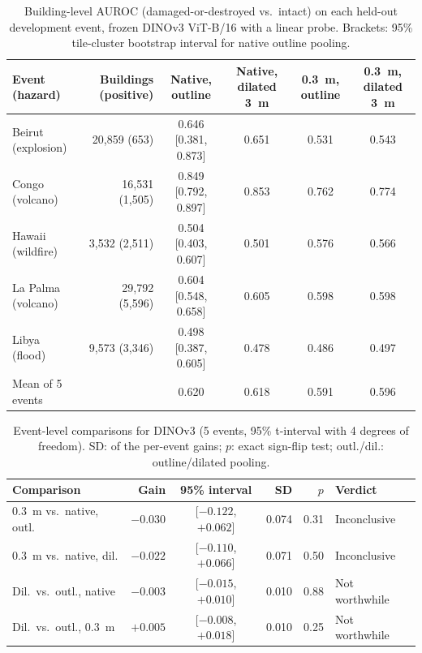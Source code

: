 \documentclass{ieeeaccess}
\begin{document}
\begin{table}[t]
\centering
\caption{Building-level AUROC (damaged-or-destroyed vs.\ intact) on each held-out development event, frozen DINOv3 ViT-B/16 with a linear probe. Brackets: 95\% tile-cluster bootstrap interval for native outline pooling.}
\label{tab:auroc}
\footnotesize
\begin{tabular}{@{}lrcccc@{}}
\toprule
Event (hazard) & Buildings (positive) & Native, outline & Native, dilated 3~m & 0.3~m, outline & 0.3~m, dilated 3~m \\
\midrule
Beirut (explosion) & 20,859 (653) & 0.646 [0.381, 0.873] & 0.651 & 0.531 & 0.543 \\
Congo (volcano) & 16,531 (1,505) & 0.849 [0.792, 0.897] & 0.853 & 0.762 & 0.774 \\
Hawaii (wildfire) & 3,532 (2,511) & 0.504 [0.403, 0.607] & 0.501 & 0.576 & 0.566 \\
La Palma (volcano) & 29,792 (5,596) & 0.604 [0.548, 0.658] & 0.605 & 0.598 & 0.598 \\
Libya (flood) & 9,573 (3,346) & 0.498 [0.387, 0.605] & 0.478 & 0.486 & 0.497 \\
\midrule
Mean of 5 events & & 0.620 & 0.618 & 0.591 & 0.596 \\
\bottomrule
\end{tabular}
\end{table}

\begin{table}[t]
\centering
\caption{Event-level comparisons for DINOv3 (5 events, 95\% t-interval with 4 degrees of freedom). SD: of the per-event gains; $p$: exact sign-flip test; outl./dil.: outline/dilated pooling.}
\label{tab:cmp}
\scriptsize
\setlength{\tabcolsep}{2.5pt}
\begin{tabular}{@{}lrcrrl@{}}
\toprule
Comparison & Gain & 95\% interval & SD & $p$ & Verdict \\
\midrule
0.3~m vs.\ native, outl. & $-0.030$ & [$-0.122$, $+0.062$] & 0.074 & 0.31 & Inconclusive \\
0.3~m vs.\ native, dil. & $-0.022$ & [$-0.110$, $+0.066$] & 0.071 & 0.50 & Inconclusive \\
Dil.\ vs.\ outl., native & $-0.003$ & [$-0.015$, $+0.010$] & 0.010 & 0.88 & Not worthwhile \\
Dil.\ vs.\ outl., 0.3~m & $+0.005$ & [$-0.008$, $+0.018$] & 0.010 & 0.25 & Not worthwhile \\
\bottomrule
\end{tabular}
\end{table}
\end{document}
